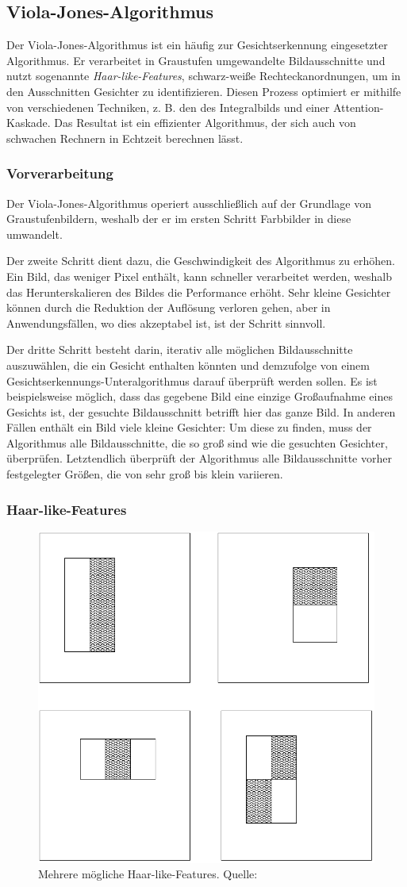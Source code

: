 \documentclass[doktyp=semarbeit, sprache=german]{TUBAFarbeiten}
\begin{document}
\subsection{Viola-Jones-Algorithmus}
Der Viola-Jones-Algorithmus ist ein häufig zur Gesichtserkennung eingesetzter Algorithmus. Er verarbeitet in Graustufen umgewandelte Bildausschnitte und nutzt sogenannte \textit{Haar-like-Features}, schwarz-weiße Rechteckanordnungen, um in den Ausschnitten Gesichter zu identifizieren. Diesen Prozess optimiert er mithilfe von verschiedenen Techniken, z. B. den des Integralbilds und einer Attention-Kaskade. Das Resultat ist ein effizienter Algorithmus, der sich auch von schwachen Rechnern in Echtzeit berechnen lässt.

\subsubsection{Vorverarbeitung}
Der Viola-Jones-Algorithmus operiert ausschließlich auf der Grundlage von Graustufenbildern, weshalb der er im ersten Schritt Farbbilder in diese umwandelt.

Der zweite Schritt dient dazu, die Geschwindigkeit des Algorithmus zu erhöhen. Ein Bild, das weniger Pixel enthält, kann schneller verarbeitet werden, weshalb das Herunterskalieren des Bildes die Performance erhöht. Sehr kleine Gesichter können durch die Reduktion der Auflösung verloren gehen, aber in Anwendungsfällen, wo dies akzeptabel ist, ist der Schritt sinnvoll.

Der dritte Schritt besteht darin, iterativ alle möglichen Bildausschnitte auszuwählen, die ein Gesicht enthalten könnten und demzufolge von einem Gesichtserkennungs-Unteralgorithmus darauf überprüft werden sollen. Es ist beispielsweise möglich, dass das gegebene Bild eine einzige Großaufnahme eines Gesichts ist, der gesuchte Bildausschnitt betrifft hier das ganze Bild. In anderen Fällen enthält ein Bild viele kleine Gesichter: Um diese zu finden, muss der Algorithmus alle Bildausschnitte, die so groß sind wie die gesuchten Gesichter, überprüfen. Letztendlich überprüft der Algorithmus alle Bildausschnitte vorher festgelegter Größen, die von sehr groß bis klein variieren.

\subsubsection{Haar-like-Features}
\begin{figure}
	\centering
	\includegraphics[width=0.4\linewidth]{images/haarfeatures}
	\caption[Haar-like-Features]{Mehrere mögliche Haar-like-Features. Quelle: \cite{Viola01rapidobject}}
	\label{fig:haarfeatures}
\end{figure}
\end{document}

